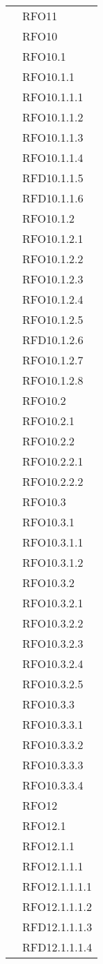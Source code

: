 \begin{longtable}{ p{12cm} | p{3cm} }
		    & RFO11 \\
		    & RFO10 \\
& RFO10.1 \\
& RFO10.1.1 \\
& RFO10.1.1.1 \\
& RFO10.1.1.2 \\
& RFO10.1.1.3 \\
& RFO10.1.1.4 \\
& RFD10.1.1.5 \\
& RFD10.1.1.6 \\
& RFO10.1.2 \\
& RFO10.1.2.1 \\
& RFO10.1.2.2 \\
& RFO10.1.2.3 \\
& RFO10.1.2.4 \\
& RFO10.1.2.5 \\
& RFD10.1.2.6 \\
& RFO10.1.2.7 \\
& RFO10.1.2.8 \\
& RFO10.2 \\
& RFO10.2.1 \\
& RFO10.2.2 \\
& RFO10.2.2.1 \\
& RFO10.2.2.2 \\
& RFO10.3 \\
& RFO10.3.1 \\
& RFO10.3.1.1 \\
& RFO10.3.1.2 \\
& RFO10.3.2 \\
& RFO10.3.2.1 \\
& RFO10.3.2.2 \\
& RFO10.3.2.3 \\
& RFO10.3.2.4 \\
& RFO10.3.2.5 \\
& RFO10.3.3 \\
& RFO10.3.3.1 \\
& RFO10.3.3.2 \\
& RFO10.3.3.3 \\
& RFO10.3.3.4 \\
& RFO12 \\
& RFO12.1 \\
& RFO12.1.1 \\
& RFO12.1.1.1 \\
& RFO12.1.1.1.1 \\
& RFO12.1.1.1.2 \\
& RFD12.1.1.1.3 \\
& RFD12.1.1.1.4 \\

\end{longtable}

